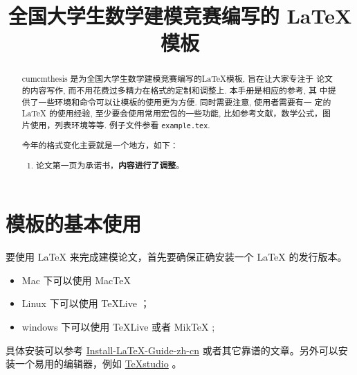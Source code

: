 \documentclass[withoutpreface,bwprint]{cumcmthesis}
\title{全国大学生数学建模竞赛编写的 \LaTeX{} 模板}
\begin{document}
\maketitle

\begin{abstract}
cumcmthesis 是为全国大学生数学建模竞赛编写的\LaTeX{}模板, 旨在让大家专注于 论文的内容写作, 而不用花费过多精力在格式的定制和调整上. 本手册是相应的参考, 其 中提供了一些环境和命令可以让模板的使用更为方便. 同时需要注意, 使用者需要有一 定的 \LaTeX{} 的使用经验, 至少要会使用常用宏包的一些功能, 比如参考文献，数学公式，图片使用，列表环境等等. 例子文件参看 \texttt{example.tex}.

\begin{mdframed} [%
	roundcorner=5pt,
	linecolor=gray!50,
	outerlinewidth=0.5pt,
	middlelinewidth=0.3pt, backgroundcolor=gray!2,
innertopmargin=\topskip, frametitle={2023 年建模比赛格式变化说明},
frametitlefont= \bfseries,frametitlerule=true,frametitlealignment =\raggedright\noindent,
frametitlerulewidth=.5pt, frametitlebackgroundcolor=gray!2,]
今年的格式变化主要就是一个地方，如下：
\begin{enumerate}
\item 论文第一页为承诺书，\textbf{\color{red}内容进行了调整}。

\end{enumerate}

\end{mdframed}


\end{abstract}

\tableofcontents

\newpage

\section{模板的基本使用}

要使用 \LaTeX{} 来完成建模论文，首先要确保正确安装一个 \LaTeX{} 的发行版本。

\begin{itemize}
    \item Mac 下可以使用 Mac\TeX{}
    \item Linux 下可以使用 \TeX{}Live ；
    \item windows 下可以使用 \TeX{}Live 或者 Mik\TeX{} ;
\end{itemize}

具体安装可以参考 \href{https://github.com/OsbertWang/install-latex-guide-zh-cn/releases/}{Install-LaTeX-Guide-zh-cn} 或者其它靠谱的文章。另外可以安装一个易用的编辑器，例如 \href{https://mirrors.tuna.tsinghua.edu.cn/github-release/texstudio-org/texstudio/LatestRelease/}{\TeX{}studio} 。
\end{document}
